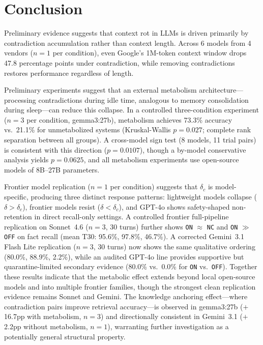 \documentclass[11pt,a4paper]{article}
\begin{document}
\section{Conclusion}
\label{sec:conclusion}

Preliminary evidence suggests that context rot in LLMs is driven primarily by contradiction accumulation rather than context length.
Across 6 models from 4 vendors ($n = 1$ per condition), even Google's 1M-token context window drops 47.8 percentage points under contradiction, while removing contradictions restores performance regardless of length.

Preliminary experiments suggest that an external metabolism architecture---processing contradictions during idle time, analogous to memory consolidation during sleep---can reduce this collapse.
In a controlled three-condition experiment ($n = 3$ per condition, gemma3:27b), metabolism achieves 73.3\% accuracy vs.\ 21.1\% for unmetabolized systems (Kruskal-Wallis $p = 0.027$; complete rank separation between all groups).
A cross-model sign test (8 models, 11 trial pairs) is consistent with this direction ($p = 0.0107$), though a by-model conservative analysis yields $p = 0.0625$, and all metabolism experiments use open-source models of 8B--27B parameters.

Frontier model replication ($n = 1$ per condition) suggests that $\delta_c$ is model-specific, producing three distinct response patterns: lightweight models collapse ($\delta > \delta_c$), frontier models resist ($\delta < \delta_c$), and GPT-4o shows safety-shaped non-retention in direct recall-only settings. A controlled frontier full-pipeline replication on Sonnet~4.6 ($n = 3$, 30 turns) further shows \texttt{ON} $\approx$ \texttt{NC} and \texttt{ON} $\gg$ \texttt{OFF} on fact recall (mean T30: 95.6\%, 97.8\%, 46.7\%). A corrected Gemini~3.1 Flash Lite replication ($n = 3$, 30 turns) now shows the same qualitative ordering (80.0\%, 88.9\%, 2.2\%), while an audited GPT-4o line provides supportive but quarantine-limited secondary evidence (80.0\% vs.\ 0.0\% for \texttt{ON} vs.\ \texttt{OFF}). Together these results indicate that the metabolic effect extends beyond local open-source models and into multiple frontier families, though the strongest clean replication evidence remains Sonnet and Gemini.
The knowledge anchoring effect---where contradiction pairs improve retrieval accuracy---is observed in gemma3:27b ($+$16.7pp with metabolism, $n = 3$) and directionally consistent in Gemini~3.1 ($+$2.2pp without metabolism, $n = 1$), warranting further investigation as a potentially general structural property.
\end{document}
